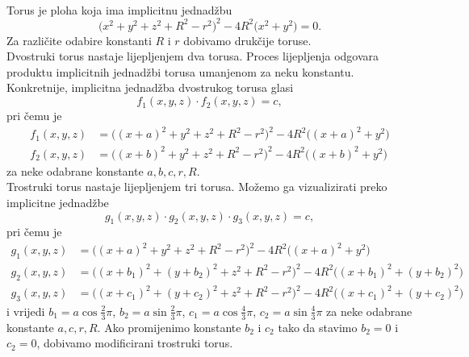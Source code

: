 \documentclass[a4paper,12pt]{article}
\theoremstyle{zad}
\begin{document}
\begin{center}
\\[2pt]
\end{center}
Torus je ploha koja ima implicitnu jednad\v{z}bu
$$\big(x^2+y^2+z^2+R^2-r^2\big)^2-4R^2\big(x^2+y^2\big)=0.$$
Za razli\v{c}ite odabire konstanti $R$ i $r$ dobivamo druk\v{c}ije toruse.\\[5pt]
Dvostruki torus nastaje lijepljenjem dva torusa. Proces lijepljenja odgovara produktu
implicitnih jednad\v{z}bi torusa umanjenom za neku konstantu. Konkretnije, implicitna
jednad\v{z}ba dvostrukog torusa glasi
$$f_1(x,y,z)\cdot f_2(x,y,z)=c,$$
pri \v{c}emu je
\begin{align*}
f_1(x,y,z)&=\big((x+a)^2+y^2+z^2+R^2-r^2\big)^2-4R^2\big((x+a)^2+y^2\big)\\
f_2(x,y,z)&=\big((x+b)^2+y^2+z^2+R^2-r^2\big)^2-4R^2\big((x+b)^2+y^2\big)
\end{align*}
za neke odabrane konstante $a,b,c,r,R$.\\[5pt]
Trostruki torus nastaje lijepljenjem tri torusa. Mo\v{z}emo ga vizualizirati preko
implicitne jednad\v{z}be
$$g_1(x,y,z)\cdot g_2(x,y,z)\cdot g_3(x,y,z)=c,$$
pri \v{c}emu je
\begin{align*}
g_1(x,y,z)&=\big((x+a)^2+y^2+z^2+R^2-r^2\big)^2-4R^2\big((x+a)^2+y^2\big)\\
g_2(x,y,z)&=\big((x+b_1)^2+(y+b_2)^2+z^2+R^2-r^2\big)^2-4R^2\big((x+b_1)^2+(y+b_2)^2\big)\\
g_3(x,y,z)&=\big((x+c_1)^2+(y+c_2)^2+z^2+R^2-r^2\big)^2-4R^2\big((x+c_1)^2+(y+c_2)^2\big)
\end{align*}
i vrijedi $b_1=a\cos{\frac{2}{3}\pi}$, $b_2=a\sin{\frac{2}{3}\pi}$, $c_1=a\cos{\frac{4}{3}\pi}$,
$c_2=a\sin{\frac{4}{3}\pi}$ za neke odabrane\vspace*{2pt} konstante $a,c,r,R$. Ako promijenimo konstante $b_2$ i $c_2$ tako da stavimo $b_2=0$ i $c_2=0$, dobivamo modificirani trostruki torus.
\end{document}
